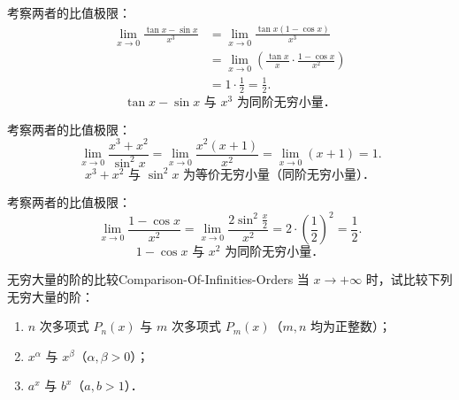 \begin{solution}

    考察两者的比值极限：
    \begin{equation}
        \begin{aligned}
            \lim_{x\to 0} \frac{\tan x - \sin x}{x^3} & = \lim_{x\to 0} \frac{\tan x(1 - \cos x)}{x^3}                               \\
                                                      & = \lim_{x\to 0} \left( \frac{\tan x}{x} \cdot \frac{1 - \cos x}{x^2} \right) \\
                                                      & = 1 \cdot \frac{1}{2} = \frac{1}{2}.
        \end{aligned}
    \end{equation}
    \begin{equation}
        \boxed{\tan x - \sin x \text{ 与 } x^3 \text{ 为同阶无穷小量．}}
    \end{equation}


    考察两者的比值极限：
    \begin{equation}
        \lim_{x\to 0} \frac{x^3 + x^2}{\sin^2 x} = \lim_{x\to 0} \frac{x^2(x + 1)}{x^2} = \lim_{x\to 0} (x + 1) = 1.
    \end{equation}
    \begin{equation}
        \boxed{x^3 + x^2 \text{ 与 } \sin^2 x \text{ 为等价无穷小量（同阶无穷小量）．}}
    \end{equation}


    考察两者的比值极限：
    \begin{equation}
        \lim_{x\to 0} \frac{1 - \cos x}{x^2} = \lim_{x\to 0} \frac{2\sin^2 \frac{x}{2}}{x^2} = 2 \cdot \left( \frac{1}{2} \right)^2 = \frac{1}{2}.
    \end{equation}
    \begin{equation}
        \boxed{1 - \cos x \text{ 与 } x^2 \text{ 为同阶无穷小量．}}
    \end{equation}
\end{solution}

\begin{problem}{无穷大量的阶的比较}{Comparison-Of-Infinities-Orders}
    当 $x \to +\infty$ 时，试比较下列无穷大量的阶：
    \begin{enumerate}
        \item $n$ 次多项式 $P_n(x)$ 与 $m$ 次多项式 $P_m(x)$（$m, n$ 均为正整数）；
        \item $x^\alpha$ 与 $x^\beta$（$\alpha, \beta > 0$）；
        \item $a^x$ 与 $b^x$（$a, b > 1$）．
    \end{enumerate}
\end{problem}

